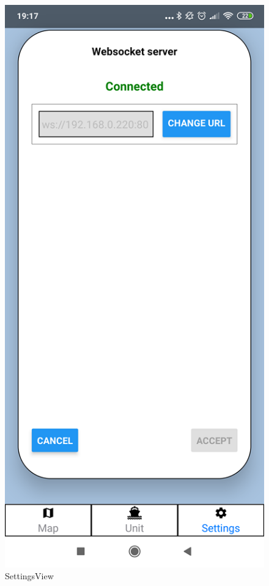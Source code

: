 \documentclass[skorowidz,skroty]{dyplomWEZUT}
\begin{document}
\begin{figure}[H]
  \centering
    \includegraphics[scale=0.2]{graphic/Settings}
    \caption{SettingsView}
    \label{fig:SettingsView}
\end{figure}

%
%
\end{document}
